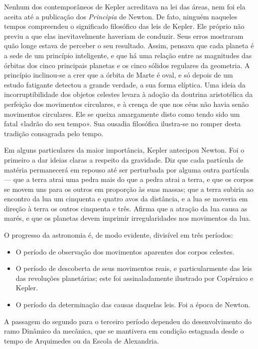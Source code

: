 \documentclass[11pt,a5paper,twoside,openany]{book}
\begin{document}
Nenhum dos contemporâneos de Kepler acreditava na lei das áreas, nem foi ela aceita até a publicação dos \textit{Principia} de Newton. De fato, ninguém naqueles tempos compreendeu o significado filosófico das leis de Kepler. Ele próprio não previu a que elas inevitavelmente haveriam de conduzir. Seus erros mostraram quão longe estava de perceber o seu resultado. Assim, pensava que cada planeta é a sede de um princípio inteligente, e que há uma relação entre as magnitudes das órbitas dos cinco principais planetas e os cinco sólidos regulares da geometria. A princípio inclinou-se a crer que a órbita de Marte é oval, e só depois de um estudo fatigante detectou a grande verdade, a sua forma elíptica. Uma ideia da incorruptibilidade dos objetos celestes levara à adoção da doutrina aristotélica da perfeição dos movimentos circulares, e à crença de que nos céus não havia senão movimentos circulares. Ele se queixa amargamente disto como tendo sido um fatal «ladrão do seu tempo». Sua ousadia filosófica ilustra-se no romper desta tradição consagrada pelo tempo.

Em alguns particulares da maior importância, Kepler antecipou Newton. Foi o primeiro a dar ideias claras a respeito da gravidade. Diz que cada partícula de matéria permanecerá em repouso até ser perturbada por alguma outra partícula — que a terra atrai uma pedra mais do que a pedra atrai a terra, e que os corpos se movem uns para os outros em proporção às suas massas; que a terra subiria ao encontro da lua um cinquenta e quatro avos da distância, e a lua se moveria em direção à terra os outros cinquenta e três. Afirma que a atração da lua causa as marés, e que os planetas devem imprimir irregularidades nos movimentos da lua.

O progresso da astronomia é, de modo evidente, divisível em três períodos:

\begin{itemize}
\item O período de observação dos movimentos aparentes dos corpos celestes.
\end{itemize}
\begin{itemize}
\item O período de descoberta de seus movimentos reais, e particularmente das leis das revoluções planetárias; este foi assinaladamente ilustrado por Copérnico e Kepler.
\end{itemize}
\begin{itemize}
\item O período da determinação das causas daquelas leis. Foi a época de Newton.
\end{itemize}
A passagem do segundo para o terceiro período dependeu do desenvolvimento do ramo Dinâmico da mecânica, que se mantivera em condição estagnada desde o tempo de Arquimedes ou da Escola de Alexandria.
\end{document}
